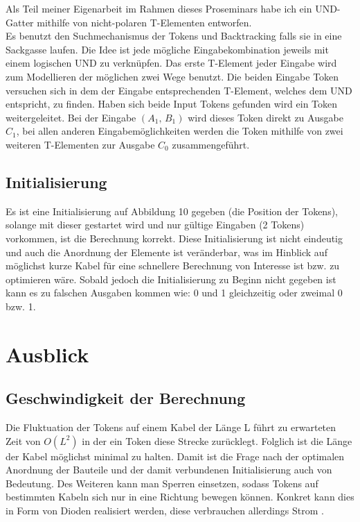 \documentclass[11pt,a4paper]{article}
\begin{document}
Als Teil meiner Eigenarbeit im Rahmen dieses Proseminars habe ich ein UND-Gatter
mithilfe von nicht-polaren T-Elementen entworfen. \\
%
Es benutzt den Suchmechanismus der Tokens und Backtracking falls sie in eine 
Sackgasse laufen. 
%
Die Idee ist jede mögliche Eingabekombination jeweils mit einem 
logischen UND zu verknüpfen. 
%
Das erste T-Element jeder Eingabe wird zum Modellieren
der möglichen zwei Wege benutzt.
%
Die beiden Eingabe Token versuchen sich in dem der Eingabe entsprechenden
T-Element, welches dem UND entspricht, zu finden.
%
Haben sich beide Input Tokens gefunden wird ein Token weitergeleitet.
Bei der Eingabe $ (A_{1},\, B_{1}) $ wird dieses Token direkt zu Ausgabe
$ C_{1} $, bei allen anderen Eingabemöglichkeiten werden die Token mithilfe
von zwei weiteren T-Elementen zur Ausgabe $ C_{0} $ zusammengeführt. 


\subsection{Initialisierung}
Es ist eine Initialisierung auf Abbildung 10 gegeben (die Position der Tokens), 
solange mit dieser gestartet wird und nur gültige Eingaben (2 Tokens) 
vorkommen, ist die Berechnung korrekt.
%
Diese Initialisierung ist nicht eindeutig und auch die Anordnung der
Elemente ist veränderbar, was im Hinblick auf möglichst kurze Kabel 
für eine schnellere Berechnung von Interesse ist bzw. zu optimieren wäre.
%
Sobald jedoch die Initialisierung zu Beginn nicht gegeben ist kann es zu 
falschen Ausgaben kommen wie: 0 und 1 gleichzeitig oder zweimal 0 bzw. 1. 



\section{Ausblick}
\subsection{Geschwindigkeit der Berechnung}
Die Fluktuation der Tokens auf einem Kabel der Länge L führt zu 
erwarteten Zeit von $ O(L^2) $ in der ein Token diese Strecke zurücklegt.
%
Folglich ist die Länge der Kabel möglichst minimal zu halten. 
%
Damit ist die Frage nach der optimalen Anordnung der Bauteile und der damit 
verbundenen Initialisierung auch von Bedeutung.
%
Des Weiteren kann man Sperren einsetzen, sodass Tokens
auf bestimmten Kabeln sich nur in eine Richtung bewegen können. 
%
Konkret kann dies in Form von Dioden realisiert werden, diese verbrauchen
allerdings Strom \cite{Peper_Fundamentals_2013}.
\end{document}
